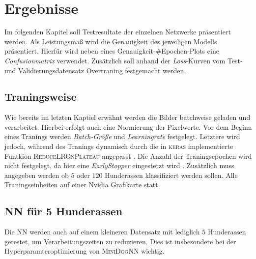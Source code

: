 \section{Ergebnisse}
Im folgenden Kapitel soll Testresultate der einzelnen Netzwerke präsentiert
werden. Als Leistungsmaß wird die Genauigkeit des jeweiligen Modells präsentiert.
Hierfür wird neben eines Genauigkeit-\#Epochen-Plots eine \emph{Confusionmatrix}
verwendet. Zusätzlich soll anhand der \emph{Loss}-Kurven vom Test- und Validierungsdatensatz
Overtraning festgemacht werden.

\subsection{Traningsweise}
Wie bereits im letzten Kaptiel erwähnt werden die
Bilder batchweise geladen und verarbeitet. Hierbei erfolgt auch eine Normierung
der Pixelwerte. Vor dem Beginn eines Tranings werden \emph{Batch-Größe} und
\emph{Learningrate} festgelegt. Letztere wird jedoch, während des Tranings dynamisch
durch die in \textsc{keras} implementierte Funtkion \textsc{ReduceLROnPlateau}
angepasst \cite{keras_ReduceLROnPlateau}. Die Anzahl der Traningsepochen
wird nicht festgelegt, da hier eine \emph{EarlyStopper} eingestetzt wird \cite{keras_EarlyStopping}.
Zusätzlich muss angegeben werden ob $5$ oder $120$ Hunderassen
klassifiziert werden sollen. Alle Traningseinheiten
auf einer Nvidia Grafikarte statt.

\subsection{NN für 5 Hunderassen}
Die NN werden auch auf einem kleineren Datensatz mit lediglich $5$ Hunderassen
getestet, um Verarbeitungszeiten zu reduzieren. Dies ist insbesondere bei
der Hyperparamteroptimierung von \textsc{MiniDogNN} wichtig.
